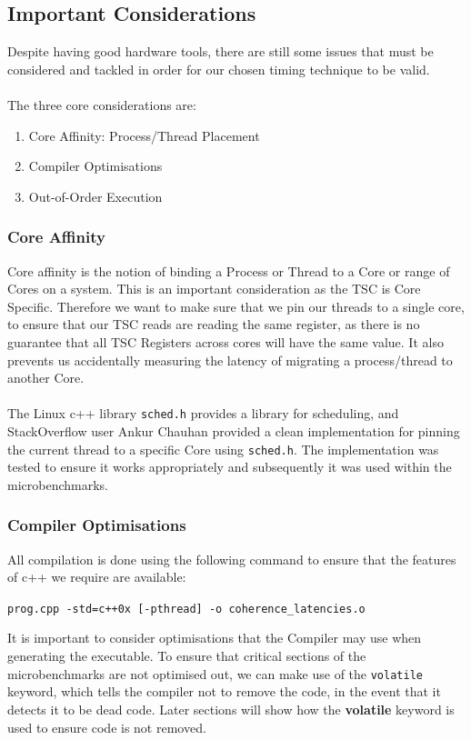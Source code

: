 \documentclass[bsc,frontabs,twoside,singlespacing,parskip,deptreport]{infthesis}     %
\begin{document}
\subsection{Important Considerations}\label{timing-considerations}
Despite having good hardware tools, there are still some issues that must be considered and tackled in order for our chosen timing technique to be valid. \\
\\
The three core considerations are:
\begin{enumerate}
    \item Core Affinity: Process/Thread Placement
    \item Compiler Optimisations
    \item Out-of-Order Execution
\end{enumerate}

\subsubsection{Core Affinity}
Core affinity is the notion of binding a Process or Thread to a Core or range of Cores on a system. This is an important consideration as the  TSC is Core Specific. Therefore we want to make sure that we pin our threads to a single core, to ensure that our TSC reads are reading the same register, as there is no guarantee that all TSC Registers across cores will have the same value. It also prevents us accidentally measuring the latency of migrating a process/thread to another Core.\\
\\
The Linux c++ library \texttt{sched.h} provides a library for scheduling, and StackOverflow user Ankur Chauhan provided a clean implementation\cite{corepin_src} for pinning the current thread to a specific Core using \texttt{sched.h}. The implementation was tested to ensure it works appropriately and subsequently it was used within the microbenchmarks.

\subsubsection{Compiler Optimisations}\label{compiler-optimisations}

All compilation is done using the following command to ensure that the features of c++ we require are available:
\begin{center}
    \texttt{prog.cpp -std=c++0x [-pthread] -o coherence\_latencies.o}
\end{center}
It is important to consider optimisations that the Compiler may use when generating the executable. To ensure that critical sections of the microbenchmarks are not optimised out, we can make use of the \texttt{volatile} keyword, which tells the compiler not to remove the code, in the event that it detects it to be dead code. Later sections will show how the \textbf{volatile} keyword is used to ensure code is not removed.
\end{document}
